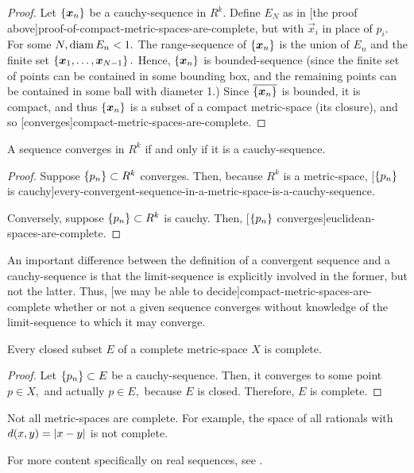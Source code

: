 \documentclass{article}
\begin{document}
\begin{proof}
Let $\left\{ \boldsymbol{x}_n \right\}$ be a \@{cauchy-sequence} in $R^k.$ Define $E_N$ as in \@[the proof above]{proof-of-compact-metric-spaces-are-complete}, but with $\vec{x}_i$ in place of $p_i.$ For some $N, \operatorname{diam}{E_n} < 1.$ The \@{range-sequence} of $\left\{ \boldsymbol{x}_n \right\}$ is the union of $E_n$ and the \@{finite} \@{set} $\left\{ \boldsymbol{x}_1, \dots, \boldsymbol{x}_{N-1} \right\}.$ Hence, $\left\{ \boldsymbol{x}_n \right\}$ is \@{bounded-sequence} (since the finite set of points can be contained in some bounding box, and the remaining points can be contained in some \@{ball} with \@{diameter} 1.) Since $\overline{\left\{ \boldsymbol{x}_n \right\}}$ is \@{bounded}, it is \@{compact}, and thus $\left\{ \boldsymbol{x}_n \right\}$ is a subset of a \@{compact} \@{metric-space} (its closure), and so \@[converges]{compact-metric-spaces-are-complete}.
\end{proof}

\begin{theorem}\label{cauchy-criterion-for-convergence}
A sequence \@{converges} in $R^k$ if and only if it is a \@{cauchy-sequence}.
\end{theorem}

\begin{proof}
Suppose $\left\{ p_n \right\} \subset R^k$ \@{converges}. Then, because $R^k$ is a \@{metric-space}, \@[$\left\{ p_n \right\}$ is cauchy]{every-convergent-sequence-in-a-metric-space-is-a-cauchy-sequence}.

Conversely, suppose $\left\{ p_n \right\} \subset R^k$ is \@{cauchy}. Then, \@[$\left\{ p_n \right\}$ converges]{euclidean-spaces-are-complete}.
\end{proof}

\detach

\begin{note}
An important difference between the definition of a \@{convergent} \@{sequence} and a \@{cauchy-sequence} is that the \@{limit-sequence} is explicitly involved in the former, but not the latter. Thus, \@[we may be able to decide]{compact-metric-spaces-are-complete} whether or not a given \@{sequence} \@{converges} without knowledge of the \@{limit-sequence} to which it may \@{converge}.
\end{note}

\begin{theorem}
Every \@{closed} \@{subset} $E$ of a \@{complete} \@{metric-space} $X$ is \@{complete}.
\end{theorem}

\begin{proof}
Let $\left\{ p_n \right\} \subset E$ be a \@{cauchy-sequence}. Then, it \@{converges} to some point $p \in X,$ and actually $p \in E,$ because $E$ is \@{closed}. Therefore, $E$ is \@{complete}.
\end{proof}

\detach

\begin{example}
Not all \@{metric-spaces} are \@{complete}. For example, the space of all rationals with $d(x, y) = \left| x - y \right|$ is not \@{complete}.
\end{example}

For more content specifically on real sequences, see .
\end{document}
